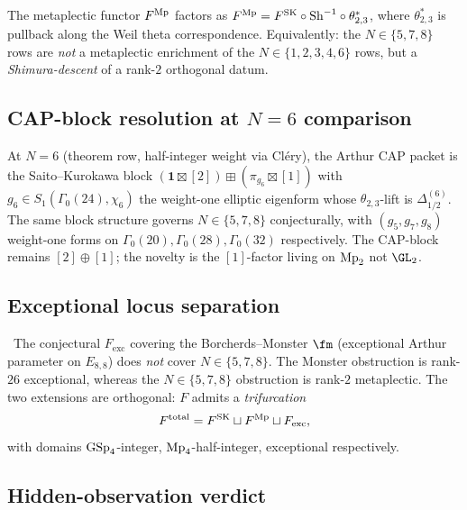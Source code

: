 \begin{conjecture}
\label{wn:conj:akn-Fmp-factors-theta}
The metaplectic functor $F^{\mathrm{Mp}}$ factors as
$F^{\mathrm{Mp}} = F^{\mathrm{SK}} \circ \mathrm{Sh}^{-1} \circ
\theta_{2,3}^*$, where $\theta_{2,3}^*$ is pullback along the Weil
theta correspondence.  Equivalently: the $N \in \{5, 7, 8\}$ rows are
\emph{not} a metaplectic enrichment of the $N \in \{1, 2, 3, 4, 6\}$
rows, but a \emph{Shimura-descent} of a rank-$2$ orthogonal datum.
\end{conjecture}

\subsection{CAP-block resolution at $N = 6$ comparison}

At $N = 6$ (theorem row, half-integer weight via Cl\'ery), the Arthur
CAP packet is the Saito--Kurokawa block
$(\mathbf 1 \boxtimes [2]) \boxplus (\pi_{g_6} \boxtimes [1])$ with
$g_6 \in S_1(\Gamma_0(24), \chi_6)$ the weight-one elliptic eigenform
whose $\theta_{2,3}$-lift is $\Delta^{(6)}_{1/2}$.  The same block
structure governs $N \in \{5, 7, 8\}$ conjecturally, with
$(g_5, g_7, g_8)$ weight-one forms on $\Gamma_0(20), \Gamma_0(28),
\Gamma_0(32)$ respectively.  The CAP-block remains
$[2] \oplus [1]$; the novelty is the $[1]$-factor living on $\mathrm{Mp}_2$
not $\GL_2$.

\subsection{Exceptional locus separation}

\begin{corollary}
\label{wn:cor:akn-boundary-vs-monster-separation}
\ClaimStatusTheorem\ The conjectural $F_{\mathrm{exc}}$ covering the
Borcherds--Monster $\fm$ (exceptional Arthur parameter on $E_{8,8}$)
does \emph{not} cover $N \in \{5, 7, 8\}$.  The Monster obstruction is
rank-$26$ exceptional, whereas the $N \in \{5, 7, 8\}$ obstruction is
rank-$2$ metaplectic.  The two extensions are orthogonal: $F$ admits a
\emph{trifurcation}
\[
F^{\mathrm{total}} = F^{\mathrm{SK}} \sqcup F^{\mathrm{Mp}} \sqcup F_{\mathrm{exc}},
\]
with domains $\mathrm{GSp}_4$-integer, $\mathrm{Mp}_4$-half-integer, exceptional
respectively.
\end{corollary}

\subsection{Hidden-observation verdict}

